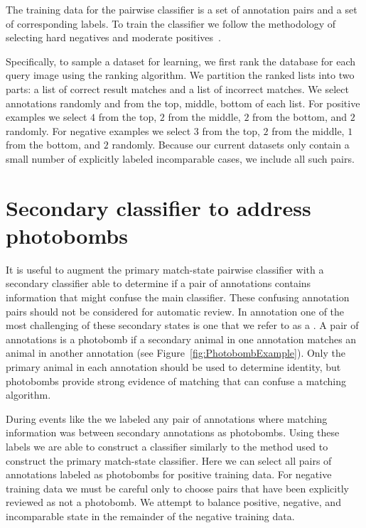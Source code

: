 The training data for the pairwise classifier is a set of annotation pairs and
  a set of corresponding labels.
To train the classifier we follow the methodology of selecting hard negatives
  and moderate positives~\cite{shi_embedding_2016}.

Specifically, to sample a dataset for learning, we first rank the database for
  each query image using the ranking algorithm.
We partition the ranked lists into two parts:
a list of correct result matches and a list of incorrect matches.
We select annotations randomly and from the top, middle, bottom of each list.
For positive examples we select $4$ from the top, $2$ from the middle, $2$
  from the bottom, and $2$ randomly.
For negative examples we select $3$ from the top, $2$ from the middle, $1$
  from the bottom, and $2$ randomly.
Because our current datasets only contain a small number of explicitly labeled
  incomparable cases, we include all such pairs.

\section{Secondary classifier to address photobombs}\label{sec:learnpb}
    It is useful to augment the primary match-state pairwise classifier with a
      secondary classifier able to determine if a pair of annotations contains
      information that might confuse the main classifier.
    These confusing annotation pairs should not be considered for automatic
      review.
    In annotation one of the most challenging of these secondary states is one
      that we refer to as a .
    A pair of annotations is a photobomb if a secondary animal in one
      annotation matches an animal in another annotation (\eg see
      Figure~\ref{fig:PhotobombExample}).
    Only the primary animal in each annotation should be used to determine
      identity, but photobombs provide strong evidence of matching that can
      confuse a matching algorithm.

    \PhotobombExample{}

    During events like the \GZC{} we labeled any pair of annotations where
      matching information was between secondary annotations as photobombs.
    Using these labels we are able to construct a classifier similarly to the
      method used to construct the primary match-state classifier.
    Here we can select all pairs of annotations labeled as photobombs for
      positive training data.
    For negative training data we must be careful only to choose pairs that
      have been explicitly reviewed as not a photobomb.
    We attempt to balance positive, negative, and incomparable state in the
      remainder of the negative training data.

